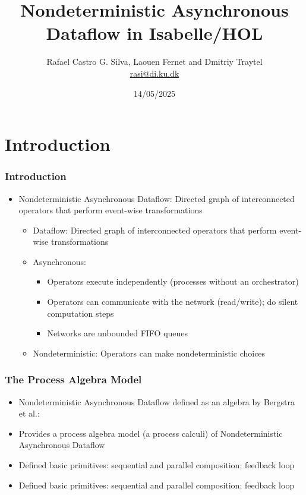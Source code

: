\documentclass[aspectratio=169,10pt]{beamer}
\title[Nondeterministic Asynchronous Dataflow in Isabelle/HOL]{Nondeterministic Asynchronous Dataflow in Isabelle/HOL}
\author[Rafael Castro, Laouen Fernet and Dmitriy Traytel]{
  Rafael Castro G. Silva, Laouen Fernet and  Dmitriy Traytel\\\medskip
  {\small \url{rasi@di.ku.dk}}}
\date{14/05/2025}
\institute[UCPH]{
  Department of Computer Science \\
  University of Copenhagen}
\begin{document}

\begin{frame}
  \titlepage

\end{frame}
\section{Introduction}

\begin{frame}[fragile]
  \frametitle{Introduction}
  \begin{itemize}
    \item Nondeterministic Asynchronous Dataflow: Directed graph of interconnected operators that perform event-wise transformations
          \begin{itemize}
            \item Dataflow: Directed graph of interconnected operators that perform event-wise transformations
            \item Asynchronous:
                  \begin{itemize}
                    \item Operators execute independently (processes without an orchestrator)
                    \item Operators can communicate with the network (read/write); do silent computation steps
                    \item Networks are unbounded FIFO queues
                  \end{itemize}
            \item Nondeterministic: Operators can make nondeterministic choices
          \end{itemize}
  \end{itemize}
\end{frame}

\begin{frame}[fragile]
  \frametitle{The Process Algebra Model}
  \begin{itemize}
    \item Nondeterministic Asynchronous Dataflow defined as an algebra by Bergstra et al.:
          \begin{figure}
            \centering
          \end{figure}
    \item Provides a process algebra model (a process calculi) of Nondeterministic Asynchronous Dataflow
    \item Defined basic primitives: sequential and parallel composition; feedback loop
    \item Defined basic primitives: sequential and parallel composition; feedback loop
  \end{itemize}
\end{frame}
\end{document}
